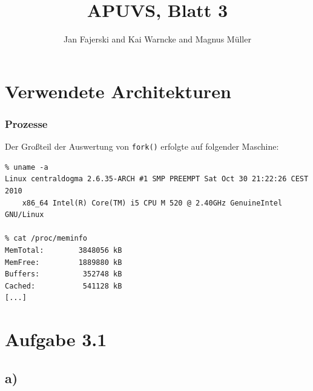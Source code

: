 \documentclass[a4paper,
12pt,
BCOR12mm,
]{scrartcl}
\title{APUVS, Blatt 3}
\author{Jan Fajerski and Kai Warncke and Magnus Müller}
\begin{document}

\maketitle  

\section{Verwendete Architekturen}
\subsubsection{Prozesse}
Der Großteil der Auswertung von \verb|fork()| erfolgte auf folgender Maschine:
\begin{verbatim}
% uname -a
Linux centraldogma 2.6.35-ARCH #1 SMP PREEMPT Sat Oct 30 21:22:26 CEST 2010
	x86_64 Intel(R) Core(TM) i5 CPU M 520 @ 2.40GHz GenuineIntel GNU/Linux

% cat /proc/meminfo
MemTotal:        3848056 kB
MemFree:         1889880 kB
Buffers:          352748 kB
Cached:           541128 kB
[...]
\end{verbatim}

\section{Aufgabe 3.1}
\subsection{a)}
\end{document}
